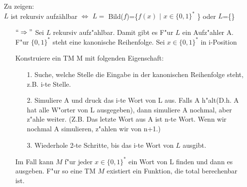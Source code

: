 \documentclass[a4paper,11pt]{scrartcl}
\begin{document}
	Zu zeigen:\\
	$L$ ist rekursiv aufz{\"a}hlbar $\iff$ $L=$ Bild($f$)=\{$f(x)$ $|$ $x\in \{0,1\}^*$ \} oder $L$=\{\}\\	
	\begin{itemize}		
		\item[$``\Rightarrow "$] 
		Sei $L$ rekursiv aufz"ahlbar. Damit gibt es F"ur $L$ ein Aufz"ahler A.\\
		F"ur $\{0,1\}^*$ steht eine kanonische Reihenfolge. Sei $x\in \{0,1\}^*$ in i-Position
		
		Konstruiere ein TM M mit folgenden Eigenschaft: 
		\begin{itemize}
			\item [1.] Suche, welche Stelle die Eingabe in der kanonischen Reihenfolge steht, z.B. i-te Stelle.
			\item [2.] Simuliere A und druck das i-te Wort von L aus. Falls A h"alt(D.h. A hat alle W"orter von L ausgegeben), dann simuliere A nochmal, aber z"ahle weiter. (Z.B. Das letzte Wort aus A ist n-te Wort. Wenn wir nochmal A simulieren, z"ahlen wir von n+1.)
			\item [3.] Wiederhole 2-te Schritte, bis das i-te Wort von $L$ ausgibt.
		\end{itemize}
	Im Fall kann $M$ f"ur jeder $x\in \{0,1\}^*$ ein Wort von L finden und dann es ausgeben. F"ur so eine TM $M$ existiert ein Funktion, die total berechenbar ist.
		
		

	\end{itemize}

	 
\end{document}
